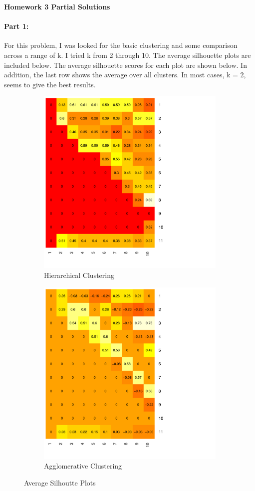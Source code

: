 \documentclass[12pt, leqno]{article}
\begin{document}
\pagestyle{fancy}

\begin{center}
{\large {\bf Homework 3 Partial Solutions}}
\end{center}

\paragraph{Part 1:} For this problem, I was looked for the basic
clustering and some comparison across a range of k. I tried k from 2
through 10. The average silhouette plots are included below. The
average silhouette scores for each plot are shown below. In addition,
the last row shows the average over all clusters. In most cases, k =
2, seems to give the best results.

\begin{figure}
\centering
\begin{subfigure}{.5\textwidth}
  \centering
  \includegraphics[width=.65\linewidth]{hclsil.pdf}
  \caption{Hierarchical Clustering}
  \label{fig:sub1}
\end{subfigure}%
\begin{subfigure}{.5\textwidth}
  \centering
  \includegraphics[width=.65\linewidth]{agnessil.pdf}
  \caption{Agglomerative Clustering}
  \label{fig:sub2}
\end{subfigure}
\caption{Average Silhoutte Plots}
\label{fig1}
\end{figure}
\end{document}
